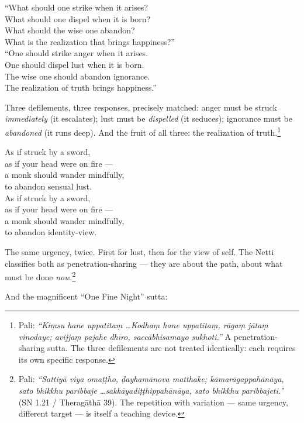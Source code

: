 \begin{versebox}
``What should one strike when it arises?\\
What should one dispel when it is born?\\
What should the wise one abandon?\\
What is the realization that brings happiness?''\\[6pt]
``One should strike anger when it arises.\\
One should dispel lust when it is born.\\
The wise one should abandon ignorance.\\
The realization of truth brings happiness.''
\end{versebox}

\noindent Three defilements, three responses, precisely matched: anger must be struck \textit{immediately} (it escalates); lust must be \textit{dispelled} (it seduces); ignorance must be \textit{abandoned} (it runs deep). And the fruit of all three: the realization of truth.\footnote{Pali: \textit{``Kiṃsu hane uppatitaṃ \ldots Kodhaṃ hane uppatitaṃ, rāgaṃ jātaṃ vinodaye; avijjaṃ pajahe dhīro, saccābhisamayo sukhoti.''} A penetration-sharing sutta. The three defilements are not treated identically: each requires its own specific response.}

\begin{versebox}
As if struck by a sword,\\
as if your head were on fire ---\\
a monk should wander mindfully,\\
to abandon sensual lust.\\[6pt]
As if struck by a sword,\\
as if your head were on fire ---\\
a monk should wander mindfully,\\
to abandon identity-view.
\end{versebox}

\noindent The same urgency, twice. First for lust, then for the view of self. The Netti classifies both as penetration-sharing --- they are about the path, about what must be done \textit{now}.\footnote{Pali: \textit{``Sattiyā viya omaṭṭho, ḍayhamānova matthake; kāmarāgappahānāya, sato bhikkhu paribbaje \ldots sakkāyadiṭṭhippahānāya, sato bhikkhu paribbajeti.''} (SN 1.21 / Theragāthā 39). The repetition with variation --- same urgency, different target --- is itself a teaching device.}

And the magnificent ``One Fine Night'' sutta:


